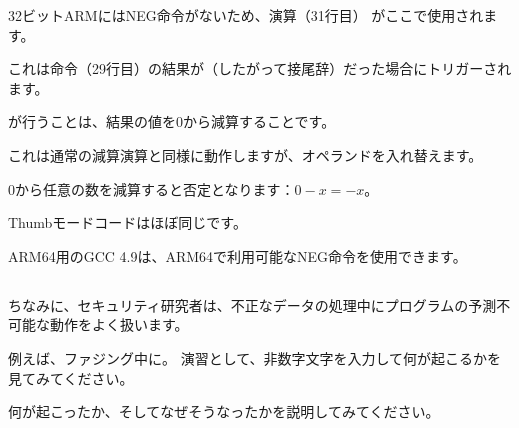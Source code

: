 32ビットARMにはNEG命令がないため、演算（31行目）
がここで使用されます。

これは命令（29行目）の結果が（したがって接尾辞）だった場合にトリガーされます。

が行うことは、結果の値を0から減算することです。

これは通常の減算演算と同様に動作しますが、オペランドを入れ替えます。

0から任意の数を減算すると否定となります：$0-x=-x$。

Thumbモードコードはほぼ同じです。

ARM64用のGCC 4.9は、ARM64で利用可能なNEG命令を使用できます。

\subsection{\Exercise{}}

ちなみに、セキュリティ研究者は、不正なデータの処理中にプログラムの予測不可能な動作をよく扱います。

例えば、ファジング中に。
演習として、非数字文字を入力して何が起こるかを見てみてください。

何が起こったか、そしてなぜそうなったかを説明してみてください。